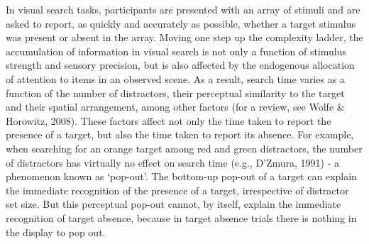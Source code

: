 \documentclass[12pt,twoside]{reedthesis}
\begin{document}
In visual search tasks, participants are presented with an array of stimuli and are asked to report, as quickly and accurately as possible, whether a target stimulus was present or absent in the array. Moving one step up the complexity ladder, the accumulation of information in visual search is not only a function of stimulus strength and sensory precision, but is also affected by the endogenous allocation of attention to items in an observed scene. As a result, search time varies as a function of the number of distractors, their perceptual similarity to the target and their spatial arrangement, among other factors (for a review, see Wolfe \& Horowitz, 2008). These factors affect not only the time taken to report the presence of a target, but also the time taken to report its absence. For example, when searching for an orange target among red and green distractors, the number of distractors has virtually no effect on search time (e.g., D'Zmura, 1991) - a phenomenon known as `pop-out'. The bottom-up pop-out of a target can explain the immediate recognition of the presence of a target, irrespective of distractor set size. But this perceptual pop-out cannot, by itself, explain the immediate recognition of target absence, because in target absence trials there is nothing in the display to pop out.
\end{document}
